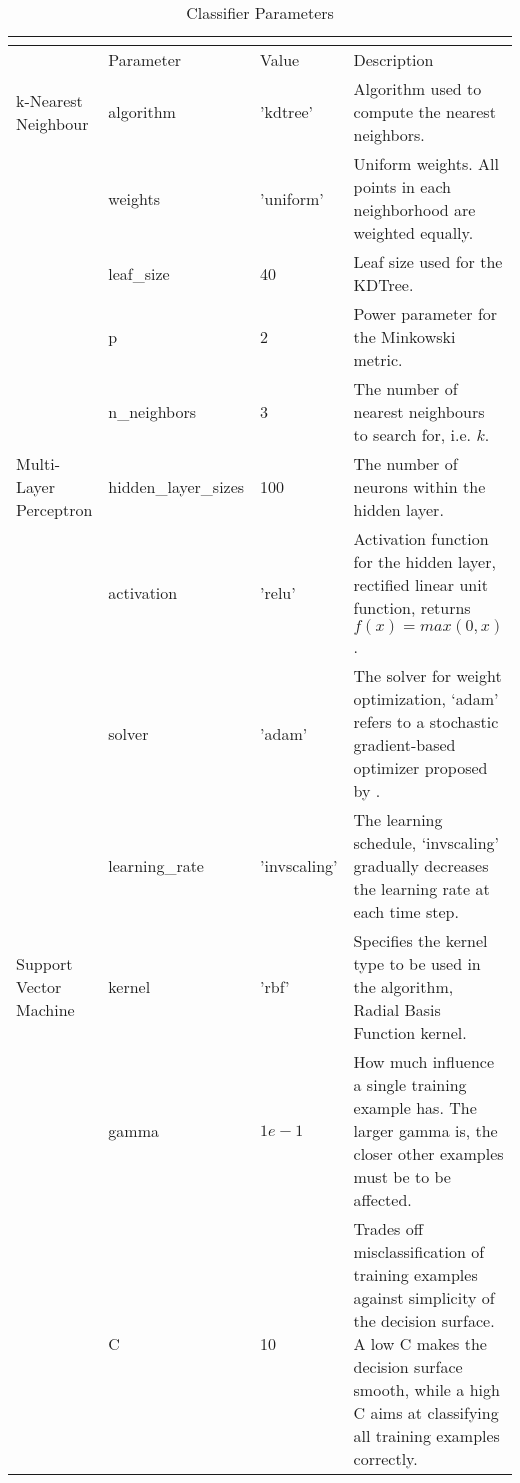 \begin{longtable}{@{}p{2cm}llp{5.5cm}@{}}
\caption{Classifier Parameters} \\
\label{params} \\
\toprule
 & Parameter & Value & Description \\ \midrule
k-Nearest Neighbour & algorithm & 'kdtree' & Algorithm used to compute the nearest neighbors. \\
 & weights & 'uniform' & Uniform weights. All points in each neighborhood are weighted equally. \\
 & leaf\_size & 40 & Leaf size used for the KDTree. \\
 & p & 2 & Power parameter for the Minkowski metric. \\
 & n\_neighbors & 3 & The number of nearest neighbours to search for, i.e. $k$. \\
Multi-Layer Perceptron & hidden\_layer\_sizes & 100 & The number of neurons within the hidden layer. \\
 & activation & 'relu' & Activation function for the hidden layer, rectified linear unit function, returns \newline $ f(x) = max(0, x) $. \\
 & solver & 'adam' & The solver for weight optimization, ‘adam’ refers to a stochastic gradient-based optimizer proposed by \cite{kingma2014adam}. \\
 & learning\_rate & 'invscaling' & The learning schedule, ‘invscaling’ gradually decreases the learning rate at each time step. \\
Support Vector Machine & kernel & 'rbf' & Specifies the kernel type to be used in the algorithm, Radial Basis Function kernel. \\
 & gamma & $ 1e-1 $ & How much influence a single training example has. The larger gamma is, the closer other examples must be to be affected. \\
 & C & 10 & Trades off misclassification of training examples against simplicity of the decision surface. A low C makes the decision surface smooth, while a high C aims at classifying all training examples correctly. \\ \bottomrule
\end{longtable}
